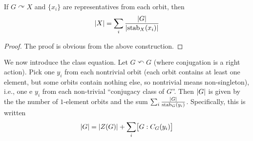 \begin{theorem}
    If $G \curvearrowright X$ and $\{x_i\}$ are representatives from each orbit, then
    \[ \left\lvert X \right\rvert = \sum_i \frac{\left\lvert G \right\rvert}{\left\lvert \operatorname{stab}_X(x_i) \right\rvert} \]
\end{theorem}
\begin{proof}
    The proof is obvious from the above construction.
\end{proof}
\noindent We now introduce the class equation. Let $G \curvearrowleft G$ (where conjugation is a right action). Pick one $y_i$ from each nontrivial orbit (each orbit contains at least one element, but some orbits contain nothing else, so nontrivial means non-singleton), i.e., one e $y_i$ from each non-trivial ``conjugacy class of $G$''. Then $\left\lvert G \right\rvert$ is given by the the number of $1$-element orbits and the sum $\sum_i \frac{\left\lvert G \right\rvert}{\operatorname{stab}_G(y_i)}$. Specifically, this is written
\[ \left\lvert G \right\rvert = \left\lvert Z(G) \right\rvert + \sum_i \bigl[G : C_G(y_i)\bigr] \]